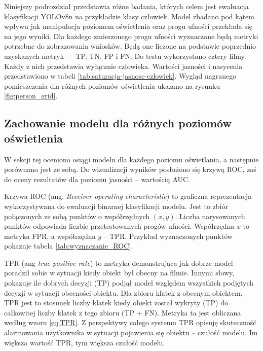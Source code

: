 Niniejszy podrozdział przedstawia różne badania, których celem jest ewaluacja klasyfikacji YOLOv8n na przykładzie klasy człowiek. Model zbadano pod kątem wpływu jak manipulacja poziomem oświetlenia oraz progu ufności przekłada się na jego wyniki. Dla każdego zmierzonego progu ufności wyznaczane będą metryki potrzebne do zobrazowania wniosków. Będą one liczone na podstawie poprzednio uzyskanych metryk --- TP, TN, FP i FN. Do testu wykorzystano cztery filmy. Każdy z nich przedstawia wyłącznie człowieka. Wartości jasności i nasycenia przedstawiono w tabeli \ref{tab:saturacja-jasnosc-czlowiek}. Wygląd nagranego pomieszczenia dla różnych poziomów oświetlenia ukazano na rysunku \ref{fig:person_grid}. 









\subsection{Zachowanie modelu dla różnych poziomów oświetlenia}
\label{sec:test-AUC}
W sekcji tej oceniono osiągi modelu dla każdego poziomu oświetlania, a następnie porównano jest ze sobą. Do wizualizacji wyników posłużono się krzywą ROC, zaś do oceny rezultatów dla poziomu jasności -- wartością AUC.

Krzywa ROC (ang. \emph{Receiver operating characteristic}) to graficzna reprezentacja wykorzystywana do ewaluacji binarnej klasyfikacji modelu. Jest to zbiór połączonych ze sobą punktów o współrzędnych $(x, y)$. Liczba narysowanych punktów odpowiada liczbie przetestowanych progów ufności. Współrzędna $x$ to metryka FPR, a współrzędna $y$ -- TPR. Przykład wyznaczonych punktów pokazuje tabela \ref{tab:wyznaczanie_ROC}. 


TPR (ang \emph{true positive rate}) to metryka demonstrująca jak dobrze model poradził sobie w sytuacji kiedy obiekt był obecny na filmie. Innymi słowy, pokazuje ile dobrych decyzji (TP) podjął model względem wszystkich podjętych decyzji w sytuacji obecności obiektu. Dla zbioru klatek z obecnym obiektem, TPR jest to stosunek liczby klatek kiedy obiekt został wykryty (TP) do całkowitej liczby klatek z tego zbioru (TP + FN). Metryka ta jest obliczana według wzoru \ref{eq:TPR}. Z perspektywy całego systemu TPR opisuję skuteczność alarmowania użytkownika w sytuacji pojawienia się obiektu -- czułość modelu. Im większa wartość TPR, tym większa czułość modelu.

